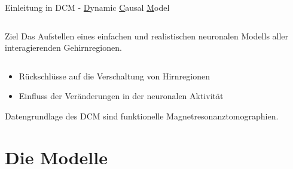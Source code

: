 \documentclass{beamer}
\begin{document}
	\begin{frame}{Einleitung in DCM - \underline{D}ynamic \underline{C}ausal \underline{M}odel}
		\begin{columns}
			\column[t]{6cm}
			\column[t]{6cm}
			\begin{exampleblock}{\centering Ziel}
				 \centering
				 Das Aufstellen eines einfachen und realistischen neuronalen Modells aller interagierenden Gehirnregionen.
			\end{exampleblock}
		\end{columns}
		\vfill
		\begin{itemize}
			\item Rückschlüsse auf die Verschaltung von Hirnregionen
			\item Einfluss der Veränderungen in der neuronalen Aktivität
		\end{itemize}
		\vfill
		\begin{center}
			Datengrundlage des DCM sind funktionelle Magnetresonanztomographien.
		\end{center}
	\end{frame}
	
\section{Die Modelle}
\end{document}
